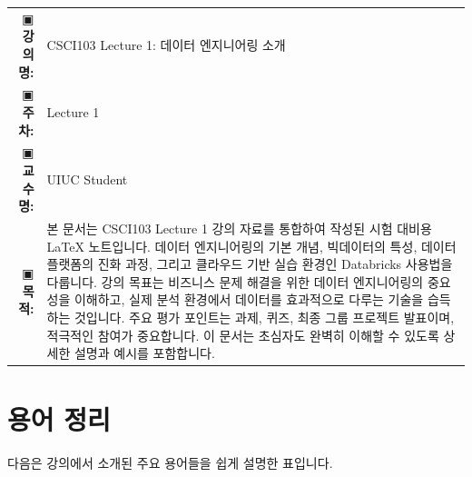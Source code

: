 \documentclass[11pt,a4paper]{article}
\makeatletter
\theoremstyle{definition}
\newcommand{\metainfo}[4]{
\begin{tcolorbox}[
    colback=lightpurple,
    colframe=darkpurple,
    boxrule=1pt,
    arc=2mm,
    left=10pt,
    right=10pt,
    top=8pt,
    bottom=8pt
]
\begin{tabular}{@{}rl@{}}
▣ \textbf{강의명:} & #1 \\[0.3em]
▣ \textbf{주차:} & #2 \\[0.3em]
▣ \textbf{교수명:} & #3 \\[0.3em]
▣ \textbf{목적:} & \begin{minipage}[t]{0.75\textwidth}#4\end{minipage}
\end{tabular}
\end{tcolorbox}
}
\makeatother
\begin{document}
\thispagestyle{firstpage}

\metainfo{CSCI103 Lecture 1: 데이터 엔지니어링 소개}{Lecture 1}{UIUC Student}{본 문서는 CSCI103 Lecture 1 강의 자료를 통합하여 작성된 시험 대비용 LaTeX 노트입니다. 데이터 엔지니어링의 기본 개념, 빅데이터의 특성, 데이터 플랫폼의 진화 과정, 그리고 클라우드 기반 실습 환경인 Databricks 사용법을 다룹니다. 강의 목표는 비즈니스 문제 해결을 위한 데이터 엔지니어링의 중요성을 이해하고, 실제 분석 환경에서 데이터를 효과적으로 다루는 기술을 습득하는 것입니다. 주요 평가 포인트는 과제, 퀴즈, 최종 그룹 프로젝트 발표이며, 적극적인 참여가 중요합니다. 이 문서는 초심자도 완벽히 이해할 수 있도록 상세한 설명과 예시를 포함합니다.}

\tableofcontents

\newpage

\section*{용어 정리}
다음은 강의에서 소개된 주요 용어들을 쉽게 설명한 표입니다.
\end{document}
